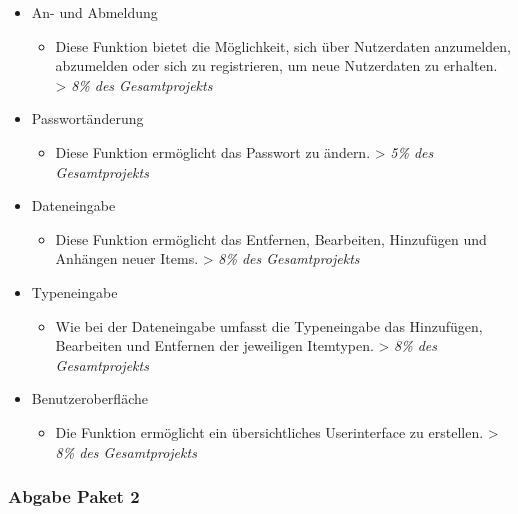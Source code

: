 \begin{itemize}
\itemsep1pt\parskip0pt
\item
  An- und Abmeldung

  \begin{itemize}
  \itemsep1pt\parskip0pt
  \item
    Diese Funktion bietet die Möglichkeit, sich über Nutzerdaten anzumelden, abzumelden
    oder sich zu registrieren, um neue Nutzerdaten zu erhalten.
    \textgreater{} \emph{8\% des Gesamtprojekts}
  \end{itemize}
\item
  Passwortänderung

  \begin{itemize}
  \itemsep1pt\parskip0pt
  \item
    Diese Funktion ermöglicht das Passwort zu ändern.
    \textgreater{} \emph{5\% des Gesamtprojekts}
  \end{itemize}
\item
  Dateneingabe

  \begin{itemize}
  \itemsep1pt\parskip0pt
  \item
    Diese Funktion ermöglicht das Entfernen, Bearbeiten, Hinzufügen und Anhängen neuer
    Items. \textgreater{} \emph{8\% des Gesamtprojekts}
  \end{itemize}
\item
  Typeneingabe

  \begin{itemize}
  \itemsep1pt\parskip0pt
  \item
    Wie bei der Dateneingabe umfasst die Typeneingabe das Hinzufügen,
    Bearbeiten und Entfernen der jeweiligen Itemtypen. \textgreater{}
    \emph{8\% des Gesamtprojekts}
  \end{itemize}
\item
  Benutzeroberfläche

  \begin{itemize}
  \itemsep1pt\parskip0pt
  \item
    Die Funktion ermöglicht ein übersichtliches Userinterface zu erstellen. \textgreater{}
    \emph{8\% des Gesamtprojekts}
  \end{itemize}
\end{itemize}

\subsubsection{Abgabe Paket 2}\label{abgabe-paket-2}


